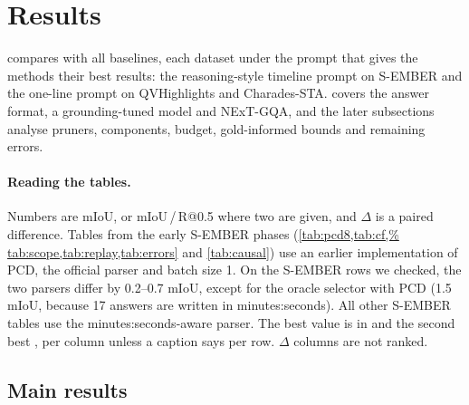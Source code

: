\section{Results}
\label{sec:results}

 compares \method with all baselines, each dataset under the prompt that gives the methods their best
results: the reasoning-style timeline prompt on S-EMBER and the one-line prompt on QVHighlights and Charades-STA.
 covers the answer format, a grounding-tuned model and NExT-GQA, and the later subsections analyse
pruners, components, budget, gold-informed bounds and remaining errors.

\paragraph{Reading the tables.}
Numbers are mIoU, or mIoU\,/\,R@0.5 where two are given, and $\Delta$ is a paired difference. Tables from the early
S-EMBER phases (\cref{tab:pcd8,tab:cf,%
tab:scope,tab:replay,tab:errors} and \cref{tab:causal}) use an earlier implementation of PCD, the official parser and
batch size 1. On the S-EMBER rows we checked, the two parsers differ by 0.2--0.7 mIoU, except for the oracle selector
with PCD (1.5 mIoU, because 17 answers are written in minutes:seconds). All other S-EMBER tables use the
minutes:seconds-aware parser. The best value is in  and the second best , per column
unless a caption says per row. $\Delta$ columns are not ranked.

\subsection{Main results}
\label{sec:main}

